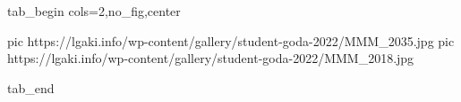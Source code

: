  
 
 
 
 

\ifcmt
  tab_begin cols=2,no_fig,center

     pic https://lgaki.info/wp-content/gallery/student-goda-2022/MMM_2035.jpg
		 pic https://lgaki.info/wp-content/gallery/student-goda-2022/MMM_2018.jpg

  tab_end
\fi
